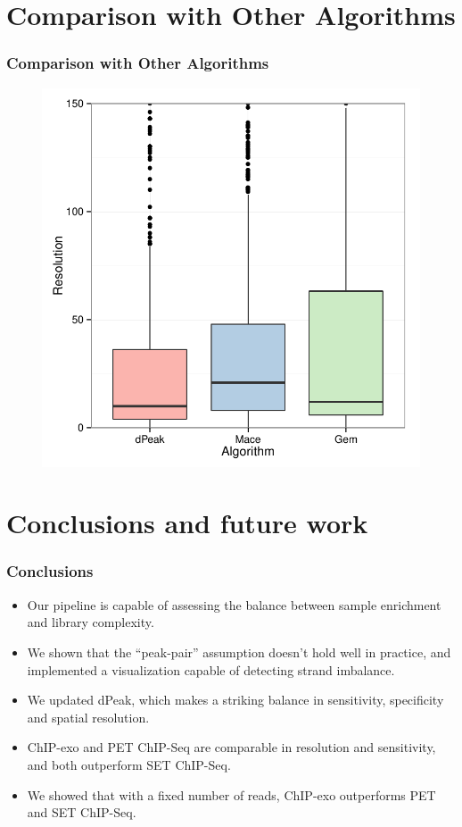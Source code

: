 \documentclass[compress,table,xcolor=dvipsnames]{beamer}\usepackage[]{graphicx}\usepackage[]{color}
\begin{document}
\section{Comparison with Other Algorithms}
\begin{frame}
\frametitle{Comparison with Other Algorithms}

\begin{figure}[H]
  \centering
  \includegraphics[width = .7\textwidth]{../figs/for_paper/algorithm_resolution.pdf}
\end{figure}
  
\end{frame}

\section{Conclusions and future work}

\begin{frame}
  \frametitle{Conclusions}

  \begin{itemize}
  \item Our pipeline is capable of assessing the balance between
    sample enrichment and library complexity.
  \item We shown that the ``peak-pair'' assumption doesn't hold well
    in practice, and implemented a visualization capable of detecting
    strand imbalance.
  \item We updated dPeak, which makes a striking balance in
    sensitivity, specificity and spatial resolution.
  \item ChIP-exo and PET ChIP-Seq are comparable in resolution and
    sensitivity, and both outperform SET ChIP-Seq.
  \item We showed that with a fixed number of reads, ChIP-exo
    outperforms PET and SET ChIP-Seq.
  \end{itemize}
\end{frame}
\end{document}

